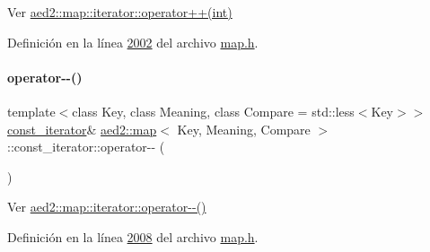 Ver \hyperlink{classaed2_1_1map_1_1iterator_af4fe5565eb478cfccd254b2ef230b974_af4fe5565eb478cfccd254b2ef230b974}{aed2\+::map\+::iterator\+::operator++(int)} 



Definición en la línea \hyperlink{map_8h_source_l02002}{2002} del archivo \hyperlink{map_8h_source}{map.\+h}.

\mbox{\label{classaed2_1_1map_1_1const__iterator_ae12d6608eeca05957fa3de3f50287c90_ae12d6608eeca05957fa3de3f50287c90}} 
\paragraph{\texorpdfstring{operator-\/-\/()}{operator--()}\hspace{0.1cm}{\footnotesize\ttfamily [1/2]}}
{\footnotesize\ttfamily template$<$class Key, class Meaning, class Compare = std\+::less$<$\+Key$>$$>$ \\
\hyperlink{classaed2_1_1map_1_1const__iterator}{const\+\_\+iterator}\& \hyperlink{classaed2_1_1map}{aed2\+::map}$<$ Key, Meaning, Compare $>$\+::const\+\_\+iterator\+::operator-\/-\/ (\begin{DoxyParamCaption}{ }\end{DoxyParamCaption})\hspace{0.3cm}{\ttfamily [inline]}}



Ver \hyperlink{classaed2_1_1map_1_1iterator_ae7f70f71545d2a9de17b65edaaec748a_ae7f70f71545d2a9de17b65edaaec748a}{aed2\+::map\+::iterator\+::operator-\/-\/()} 



Definición en la línea \hyperlink{map_8h_source_l02008}{2008} del archivo \hyperlink{map_8h_source}{map.\+h}.

\mbox{\label{classaed2_1_1map_1_1const__iterator_ad5ae1cb1d000ac1f528ff32f9af3e228_ad5ae1cb1d000ac1f528ff32f9af3e228}} 
